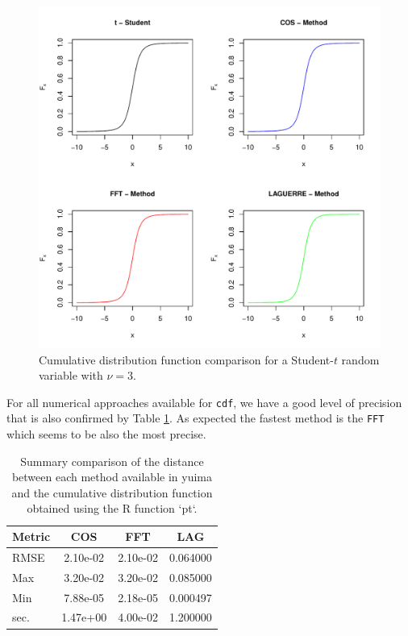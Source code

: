 \begin{figure}

{\centering \includegraphics[width=1\linewidth]{figures/CDF_Comparison_nu3_h1} 

}

\caption{Cumulative distribution function comparison for a Student-$t$ random variable with $\nu=3$.}\label{fig:CDComparisonnu3h1}
\end{figure}

For all numerical approaches available for \texttt{cdf}, we have a good level of precision that is also confirmed by Table \ref{tab:Table2Example1}. As expected the fastest method is the \texttt{FFT} which seems to be also the most precise.

\begin{table}

\caption{\label{tab:Table2Example1}Summary comparison of the distance between each method available in yuima and the cumulative distribution function obtained using the R function `pt`.}
\centering
\begin{tabular}[t]{lccc}
\toprule
Metric & COS & FFT & LAG\\
\midrule
RMSE & 2.10e-02 & 2.10e-02 & 0.064000\\
Max & 3.20e-02 & 3.20e-02 & 0.085000\\
Min & 7.88e-05 & 2.18e-05 & 0.000497\\
sec. & 1.47e+00 & 4.00e-02 & 1.200000\\
\bottomrule
\end{tabular}
\end{table}

